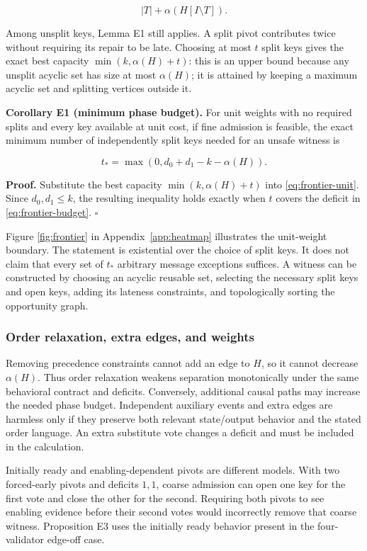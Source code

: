 \[
|T|+\alpha(H[I\setminus T]).
\]

Among unsplit keys, Lemma E1 still applies. A split pivot contributes
twice without requiring its repair to be late. Choosing at most \(t\)
split keys gives the exact best capacity \(\min(k,\alpha(H)+t)\): this
is an upper bound because any unsplit acyclic set has size at most
\(\alpha(H)\); it is attained by keeping a maximum acyclic set and
splitting vertices outside it.

\textbf{Corollary E1 (minimum phase budget).} For unit weights with no
required splits and every key available at unit cost, if fine admission
is feasible, the exact minimum number of independently split keys needed
for an unsafe witness is

\[
\boxed{t_* = \max(0,d_0+d_1-k-\alpha(H)).} \tag{E4}\label{eq:frontier-budget}
\]

\textbf{Proof.} Substitute the best capacity \(\min(k,\alpha(H)+t)\)
into \eqref{eq:frontier-unit}. Since \(d_0,d_1\le k\), the resulting
inequality holds exactly when \(t\) covers the deficit in
\eqref{eq:frontier-budget}. \(\square\)

Figure \ref{fig:frontier} in Appendix~\ref{app:heatmap} illustrates the
unit-weight boundary. The statement is existential over the choice of
split keys. It does not claim that every set of \(t_*\) arbitrary
message exceptions suffices. A witness can be constructed by choosing an
acyclic reusable set, selecting the necessary split keys and open keys,
adding its lateness constraints, and topologically sorting the
opportunity graph.

\subsubsection{Order relaxation, extra edges, and
weights}\label{order-relaxation-extra-edges-and-weights}

Removing precedence constraints cannot add an edge to \(H\), so it
cannot decrease \(\alpha(H)\). Thus order relaxation weakens separation
monotonically under the same behavioral contract and deficits.
Conversely, additional causal paths may increase the needed phase
budget. Independent auxiliary events and extra edges are harmless only
if they preserve both relevant state/output behavior and the stated
order language. An extra substitute vote changes a deficit and must be
included in the calculation.

Initially ready and enabling-dependent pivots are different models. With
two forced-early pivots and deficits \(1,1\), coarse admission can open
one key for the first vote and close the other for the second. Requiring
both pivots to see enabling evidence before their second votes would
incorrectly remove that coarse witness. Proposition E3 uses the
initially ready behavior present in the four-validator edge-off case.

